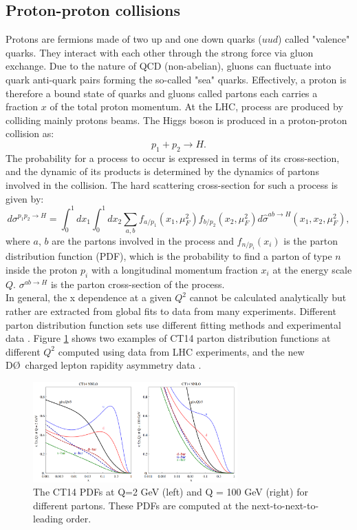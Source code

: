 \subsection{Proton-proton collisions}
\label{chap1:H2012:PP}
Protons are fermions made of two up and one down quarks ($uud$) called "valence" quarks. They interact with each other through the strong force via gluon exchange. Due to the nature of QCD (non-abelian), gluons can fluctuate into quark anti-quark pairs forming the so-called "sea" quarks. Effectively, a proton is therefore a bound state of quarks and gluons called partons each carries a fraction $x$ of the total proton momentum. At the LHC, process are produced by colliding mainly protons beams. The Higgs boson is produced in a proton-proton collision as:
\begin{equation}
    p_1 + p_2 \rightarrow H.
\end{equation}
The probability for a process to occur is expressed in terms of its cross-section, and the dynamic of its products is determined by the dynamics of partons involved in the collision. The hard scattering cross-section for such a process is given by:
\begin{equation}
    d \sigma^{p_{1} p_{2} \rightarrow H}=\int_{0}^{1} d x_{1} \int_{0}^{1} d x_{2} \sum_{a, b} f_{a / p_{1}}\left(x_{1}, \mu_{F}^{2}\right) f_{b / p_{2}}\left(x_{2}, \mu_{F}^{2}\right) d \hat{\sigma}^{a b \rightarrow H}\left(x_1, x_2, \mu_{F}^{2}\right), 
\end{equation}
where $a$, $b$ are the partons involved in the process and $f_{n/p_i}(x_i)$ is the parton distribution function (PDF), which is the probability to find a parton of type $n$ inside the proton $p_i$ with a longitudinal momentum fraction $x_i$ at the energy scale $Q$. $\sigma^{a b \rightarrow H}$ is the parton cross-section of the process. \\
In general, the x dependence at a given $Q^2$ cannot be calculated analytically but rather are extracted from global fits to data from many experiments. Different parton distribution function sets use different fitting methods and experimental data \cite{PDF}. Figure \ref{fig:chap1:H2012:PDF} shows two examples of CT14 parton distribution functions at different $Q^2$ computed using data from LHC experiments, and the new D\O \ charged lepton rapidity asymmetry data \cite{CT14}. 
\begin{figure}[htbp]
    \centering
    \includegraphics[width=0.7\textwidth]{Ch1/Img/pdf_CT14_NNLO.png}
    \caption{The CT14 PDFs at Q=2 GeV (left) and Q = 100 GeV (right) for different partons. These PDFs are computed at the next-to-next-to-leading order.}
    \label{fig:chap1:H2012:PDF}
\end{figure}
